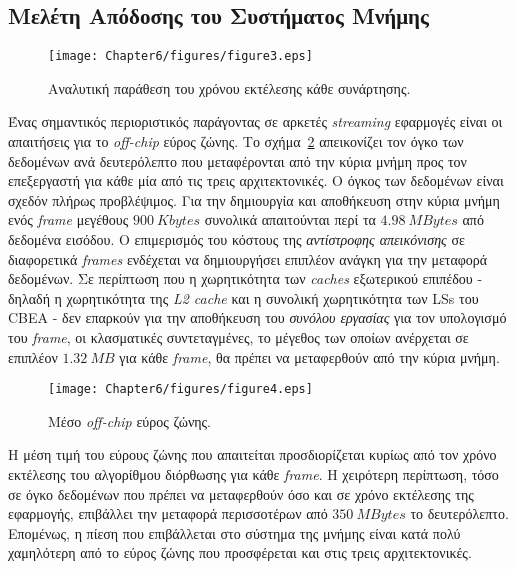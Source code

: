 \subsection[6.2.2 Μελέτη Απόδοσης του Συστήματος Μνήμης]{Μελέτη Απόδοσης του Συστήματος Μνήμης}
\label{subsection:sub622}
\begin{figure}[b]
\centering
\texttt{[image: Chapter6/figures/figure3.eps]}
\caption{Αναλυτική παράθεση του χρόνου εκτέλεσης κάθε συνάρτησης.}
\label{figure:fig63}
\end{figure}
\indent
Ένας σημαντικός περιοριστικός παράγοντας σε αρκετές \textsl{streaming} εφαρμογές είναι οι απαιτήσεις για το \textsl{off-chip} εύρος ζώνης. Το σχήμα~\ref{figure:fig64} απεικονίζει τον όγκο των δεδομένων ανά δευτερόλεπτο που μεταφέρονται από την κύρια μνήμη προς τον επεξεργαστή για κάθε μία από τις τρεις αρχιτεκτονικές.\newline \indent
Ο όγκος των δεδομένων είναι σχεδόν πλήρως προβλέψιμος. Για την δημιουργία και αποθήκευση στην κύρια μνήμη ενός \textsl{frame} μεγέθους \(900\ Kbytes\) συνολικά απαιτούνται περί τα \(4.98\ MBytes\) από δεδομένα εισόδου. Ο επιμερισμός του κόστους της \textsl{αντίστροφης απεικόνισης} σε διαφορετικά \textsl{frames} ενδέχεται να δημιουργήσει επιπλέον ανάγκη για την μεταφορά δεδομένων. Σε περίπτωση που η χωρητικότητα των \textsl{caches} εξωτερικού επιπέδου - δηλαδή η χωρητικότητα της \textsl{L2 cache} και η συνολική χωρητικότητα των \ac{LS}s του \ac{CBEA} - δεν επαρκούν για την αποθήκευση του \textsl{συνόλου εργασίας} για τον υπολογισμό του \textsl{frame}, οι κλασματικές συντεταγμένες, το μέγεθος των οποίων ανέρχεται σε επιπλέον \(1.32\ MB\) για κάθε \textsl{frame}, θα πρέπει να μεταφερθούν από την κύρια μνήμη.
\begin{figure}
\centering
\texttt{[image: Chapter6/figures/figure4.eps]}
\caption{Μέσο \textsl{off-chip} εύρος ζώνης.}
\label{figure:fig64}
\end{figure}
\newline \indent
Η μέση τιμή του εύρους ζώνης που απαιτείται προσδιορίζεται κυρίως από τον χρόνο εκτέλεσης του αλγορίθμου διόρθωσης για κάθε \textsl{frame}. Η χειρότερη περίπτωση, τόσο σε όγκο δεδομένων που πρέπει να μεταφερθούν όσο και σε χρόνο εκτέλεσης της εφαρμογής, επιβάλλει την μεταφορά περισσοτέρων από \(350\ MBytes\) το δευτερόλεπτο. Επομένως, η πίεση που επιβάλλεται στο σύστημα της μνήμης είναι κατά πολύ χαμηλότερη από το εύρος ζώνης που προσφέρεται και στις τρεις αρχιτεκτονικές.
\newline \indent
